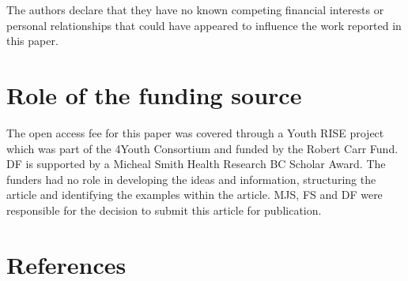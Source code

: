 \documentclass[
  letterpaper,
  DIV=11,
  numbers=noendperiod]{scrartcl}
\begin{document}
The authors declare that they have no known competing financial
interests or personal relationships that could have appeared to
influence the work reported in this paper.

\section{Role of the funding source}\label{role-of-the-funding-source}

The open access fee for this paper was covered through a Youth RISE
project which was part of the 4Youth Consortium and funded by the Robert
Carr Fund. DF is supported by a Micheal Smith Health Research BC Scholar
Award. The funders had no role in developing the ideas and information,
structuring the article and identifying the examples within the article.
MJS, FS and DF were responsible for the decision to submit this article
for publication.

\pagebreak

\section{References}\label{references}

\singlespacing

\pagebreak

\section*{}\label{sec-supp-material}
\end{document}
